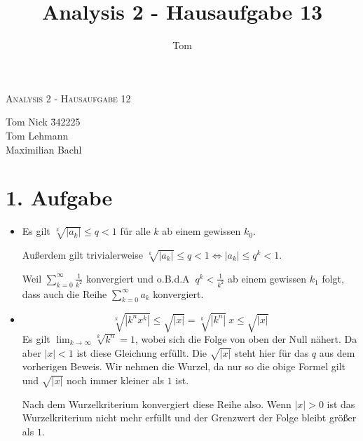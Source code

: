 \documentclass[10pt,a4paper,parskip=half]{scrartcl}
\author{Tom}
\title{Analysis 2 - Hausaufgabe 13}
\begin{document}
\begin{center}
\textsc{\Large{Analysis 2 - Hausaufgabe 12}} \\
\end{center}
\begin{tabbing}
Tom Nick \hspace{1.4cm}\= 342225\\
Tom Lehmann\\
Maximilian Bachl
\end{tabbing}
\section*{1. Aufgabe}
\begin{itemize}
\item
Es gilt $\sqrt[k]{\left|a_k\right|} \le q < 1$ für alle $k$ ab einem gewissen $k_0$. 

Außerdem gilt trivialerweise $\sqrt[k]{\left|a_k\right|} \le q <1 \Leftrightarrow \left|a_k\right| \le q^k <1$. 

Weil $\sum_{k=0}^{\infty} \frac 1 {k^2}$ konvergiert und o.B.d.A $~q^k < \frac 1 {k^2}$ ab einem gewissen $k_1$ folgt, dass auch die Reihe $\sum_{k=0}^{\infty} a_k$ konvergiert.
\item
$$\sqrt[k]{|k^nx^k|} \le \sqrt {|x|} = \sqrt[k]{|k^n|}~x \le \sqrt {|x|}$$
Es gilt $\lim_{k\to\infty} \sqrt[k]{k^n} = 1$, wobei sich die Folge von oben der Null nähert. Da aber $|x| < 1$ ist diese Gleichung erfüllt. Die $ \sqrt {|x|}$ steht hier für das $q$ aus dem vorherigen Beweis. Wir nehmen die Wurzel, da nur so die obige Formel gilt und $\sqrt {|x|}$ noch immer kleiner als $1$ ist. 

Nach dem Wurzelkriterium konvergiert diese Reihe also. Wenn $\left| x \right| > 0$ ist das Wurzelkriterium nicht mehr erfüllt und der Grenzwert der Folge bleibt größer als $1$. 
\end{itemize}
\end{document}
